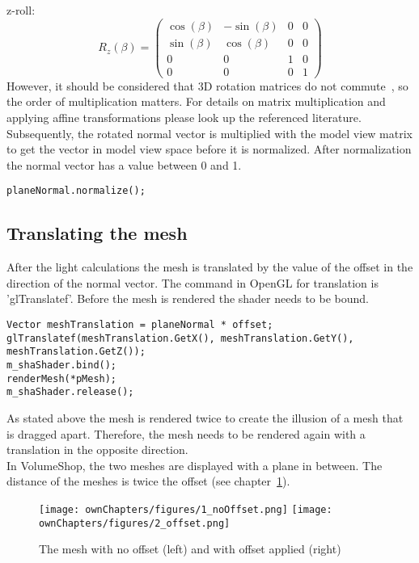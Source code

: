 \newline
z-roll:\\
\begin{equation}
R_{z}(\beta) =
\begin{pmatrix} 
	\cos(\beta) & -\sin(\beta) & 0 & 0 \\
	\sin(\beta) & \cos(\beta) & 0 & 0 \\
	0 & 0 & 1 & 0 \\
	0 & 0 & 0 & 1
\end{pmatrix}
\end{equation}
\newline
However, it should be considered that 3D rotation matrices do not commute~\cite{book:computerGraphicsHill}, so the order of multiplication matters. For details on matrix multiplication and applying affine transformations please look up the referenced literature\cite{book:computerGraphicsHearn}\cite{book:computerGraphicsHill}.
\newline
Subsequently, the rotated normal vector is multiplied with the model view matrix to get the vector in model view space before it is normalized. After normalization the normal vector has a value between 0 and 1.
\begin{lstlisting}
planeNormal.normalize();
\end{lstlisting}

\subsection{Translating the mesh}
After the light calculations the mesh is translated by the value of the offset in the direction of the normal vector. The command in OpenGL for translation is 'glTranslatef'. Before the mesh is rendered the shader needs to be bound.
\begin{lstlisting}
Vector meshTranslation = planeNormal * offset;
glTranslatef(meshTranslation.GetX(), meshTranslation.GetY(), meshTranslation.GetZ());
m_shaShader.bind();
renderMesh(*pMesh);
m_shaShader.release();
\end{lstlisting}
As stated above the mesh is rendered twice to create the illusion of a mesh that is dragged apart. Therefore, the mesh needs to be rendered again with a translation in the opposite direction.\\
In VolumeShop, the two meshes are displayed with a plane in between. The distance of the meshes is twice the offset (see chapter~\ref{fig:offset}).

\begin{figure}%
\centering
\texttt{[image: ownChapters/figures/1\_noOffset.png]}%
\hspace{7.00mm}
\texttt{[image: ownChapters/figures/2\_offset.png]}%
\caption{The mesh with no offset (left) and with offset applied (right)}%
\label{fig:offset}%
\end{figure}


